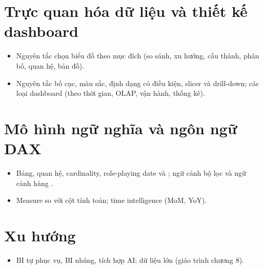 \section{Trực quan hóa dữ liệu và thiết kế dashboard}
\begin{itemize}
  \item Nguyên tắc chọn biểu đồ theo mục đích (so sánh, xu hướng, cấu thành, phân bố, quan hệ, bản đồ).
  \item Nguyên tắc bố cục, màu sắc, định dạng có điều kiện, slicer và drill-down; các loại dashboard (theo thời gian, OLAP, vận hành, thống kê).
\end{itemize}

\section{Mô hình ngữ nghĩa và ngôn ngữ DAX}
\begin{itemize}
  \item Bảng, quan hệ, cardinality, role-playing date và ; ngữ cảnh bộ lọc và ngữ cảnh hàng \cite{dax_docs}.
  \item Measure so với cột tính toán; time intelligence (MoM, YoY).
\end{itemize}

\section{Xu hướng}
\begin{itemize}
  \item BI tự phục vụ, BI nhúng, tích hợp AI; dữ liệu lớn (giáo trình chương 8).
\end{itemize}
